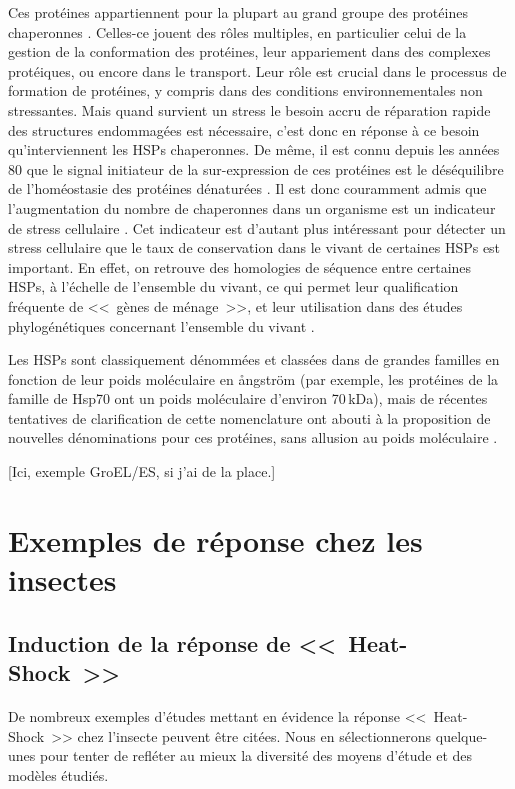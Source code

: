 	Ces protéines appartiennent pour la plupart au grand groupe des protéines chaperonnes \cite{federhoffmann1999}.
	Celles-ce jouent des rôles multiples, en particulier celui de la gestion de la conformation des protéines, leur appariement dans des complexes protéiques, ou encore dans le transport.
	Leur rôle est crucial dans le processus de formation de protéines, y compris dans des conditions environnementales non stressantes.
	Mais quand survient un stress le besoin accru de réparation rapide des structures endommagées est nécessaire, c'est donc en réponse à ce besoin qu'interviennent les HSPs chaperonnes.
	De même, il est connu depuis les années 80 que le signal initiateur de la sur-expression de ces protéines est le déséquilibre de l'homéostasie des protéines dénaturées \cite{ananthan1986}.
	Il est donc couramment admis que l'augmentation du nombre de chaperonnes dans un organisme est un indicateur de stress cellulaire \cite{ryan1996}.
	Cet indicateur est d'autant plus intéressant pour détecter un stress cellulaire que le taux de conservation dans le vivant de certaines HSPs est important.
	En effet, on retrouve des homologies de séquence entre certaines HSPs, à l'échelle de l'ensemble du vivant, ce qui permet leur qualification fréquente de <<~gènes de ménage~>>, et leur utilisation dans des études phylogénétiques concernant l'ensemble du vivant \cite{gupta1995}.

	Les HSPs sont classiquement dénommées et classées dans de grandes familles en fonction de leur poids moléculaire en ångström (par exemple, les protéines de la famille de Hsp70 ont un poids moléculaire d'environ 70\,kDa), mais de récentes tentatives de clarification de cette nomenclature ont abouti à la proposition de nouvelles dénominations pour ces protéines, sans allusion au poids moléculaire \cite{kampinga2009}.

	[Ici, exemple GroEL/ES, si j'ai de la place.]

	\section{Exemples de réponse chez les insectes}

		\subsection{Induction de la réponse de <<~Heat-Shock~>>}
		\paragraph{}
		De nombreux exemples d'études mettant en évidence la réponse <<~Heat-Shock~>> chez l'insecte peuvent être citées.
		Nous en sélectionnerons quelque-unes pour tenter de refléter au mieux la diversité des moyens d'étude et des modèles étudiés.


